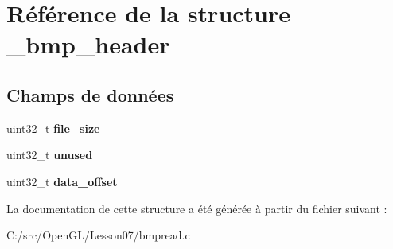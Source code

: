 \hypertarget{struct__bmp__header}{}\section{Référence de la structure \+\_\+bmp\+\_\+header}
\label{struct__bmp__header}
\subsection*{Champs de données}
\begin{DoxyCompactItemize}
\item 
\hypertarget{struct__bmp__header_acfc905fb689f590842c0152e3b8cd92e}{}uint32\+\_\+t {\bfseries file\+\_\+size}\label{struct__bmp__header_acfc905fb689f590842c0152e3b8cd92e}

\item 
\hypertarget{struct__bmp__header_aa2c870ac0d3f33ae5aa413e2416e4ceb}{}uint32\+\_\+t {\bfseries unused}\label{struct__bmp__header_aa2c870ac0d3f33ae5aa413e2416e4ceb}

\item 
\hypertarget{struct__bmp__header_a0e322da8c7e3d2d6292089c0432f885d}{}uint32\+\_\+t {\bfseries data\+\_\+offset}\label{struct__bmp__header_a0e322da8c7e3d2d6292089c0432f885d}

\end{DoxyCompactItemize}


La documentation de cette structure a été générée à partir du fichier suivant \+:\begin{DoxyCompactItemize}
\item 
C\+:/src/\+Open\+G\+L/\+Lesson07/bmpread.\+c\end{DoxyCompactItemize}

